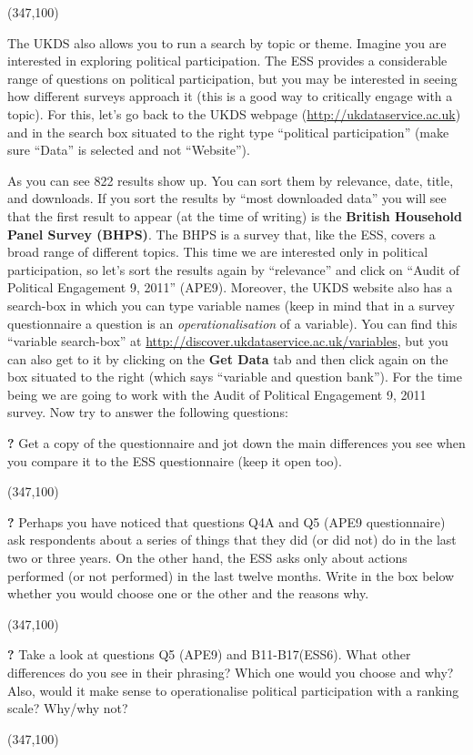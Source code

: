 \documentclass{article}
\newcommand{\forceindent}{\leavevmode{\parindent=2em\indent}}
\begin{document}
\framebox(347,100){}

The UKDS also allows you to run a search by topic or theme. Imagine you are interested in exploring political participation. The ESS provides a considerable range of questions on political participation, but you may be interested in seeing how different surveys approach it (this is a good way to critically engage with a topic). For this, let's go back to the UKDS webpage (\url{http://ukdataservice.ac.uk}) and in the search box situated to the right type ``political participation'' (make sure ``Data'' is selected and not ``Website'').

As you can see 822 results show up. You can sort them by relevance, date, title, and downloads. If you sort the results by ``most downloaded data'' you will see that the first result to appear (at the time of writing) is the \textbf{British Household Panel Survey (BHPS)}. The BHPS is a survey that, like the ESS, covers a broad range of different topics. This time we are interested only in political participation, so let's sort the results again by ``relevance'' and click on ``Audit of Political Engagement 9, 2011'' (APE9). Moreover, the UKDS website also has a search-box in which you can type variable names (keep in mind that in a survey questionnaire a question is an \textit{operationalisation} of a variable). You can find this ``variable search-box'' at \url{http://discover.ukdataservice.ac.uk/variables}, but you can also get to it by clicking on the \textbf{Get Data} tab and then click again on the box situated to the right (which says ``variable and question bank''). For the time being we are going to work with the Audit of Political Engagement 9, 2011 survey. Now try to answer the following questions:

\pagebreak

\forceindent \textbf{?} Get a copy of the questionnaire and jot down the main differences you see when you compare it to the ESS questionnaire (keep it open too).

\framebox(347,100){}

\forceindent \textbf{?} Perhaps you have noticed that questions Q4A and Q5 (APE9 questionnaire) ask respondents about a series of things that they did (or did not) do in the last two or three years. On the other hand, the ESS asks only about actions performed (or not performed) in the last twelve months. Write in the box below whether you would choose one or the other and the reasons why.

\framebox(347,100){}

\forceindent \textbf{?} Take a look at questions Q5 (APE9) and B11-B17(ESS6). What other differences do you see in their phrasing? Which one would you choose and why? Also, would it make sense to operationalise political participation with a ranking scale? Why/why not?

\framebox(347,100){}
\end{document}
